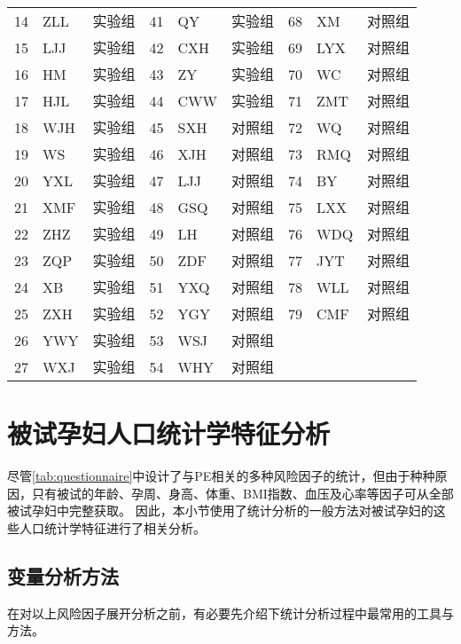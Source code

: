\begin{table}[htbp]
\begin{tabularx}{\linewidth}{X<{\centering}X<{\centering}X<{\centering}X<{\centering}X<{\centering}X<{\centering}X<{\centering}X<{\centering}X<{\centering}}
      14    & ZLL   & 实验组   & 41    & QY    & 实验组   & 68    & XM    & 对照组 \\
      15    & LJJ   & 实验组   & 42    & CXH   & 实验组   & 69    & LYX   & 对照组 \\
      16    & HM    & 实验组   & 43    & ZY    & 实验组   & 70    & WC    & 对照组 \\
      17    & HJL   & 实验组   & 44    & CWW   & 实验组   & 71    & ZMT   & 对照组 \\
      18    & WJH   & 实验组   & 45    & SXH   & 对照组   & 72    & WQ    & 对照组 \\
      19    & WS    & 实验组   & 46    & XJH   & 对照组   & 73    & RMQ   & 对照组 \\
      20    & YXL   & 实验组   & 47    & LJJ   & 对照组   & 74    & BY    & 对照组 \\
      21    & XMF   & 实验组   & 48    & GSQ   & 对照组   & 75    & LXX   & 对照组 \\
      22    & ZHZ   & 实验组   & 49    & LH    & 对照组   & 76    & WDQ   & 对照组 \\
      23    & ZQP   & 实验组   & 50    & ZDF   & 对照组   & 77    & JYT   & 对照组 \\
      24    & XB    & 实验组   & 51    & YXQ   & 对照组   & 78    & WLL   & 对照组 \\
      25    & ZXH   & 实验组   & 52    & YGY   & 对照组   & 79    & CMF   & 对照组 \\
      26    & YWY   & 实验组   & 53    & WSJ   & 对照组   &       &       &  \\
      27    & WXJ   & 实验组   & 54    & WHY   & 对照组   &       &       &  \\
      \bottomrule
      \end{tabularx}%
\end{table}%

\section{被试孕妇人口统计学特征分析}
尽管\autoref{tab:questionnaire}中设计了与PE相关的多种风险因子的统计，但由于种种原因，只有被试的年龄、孕周、身高、体重、BMI指数、血压及心率等因子可从全部被试孕妇中完整获取。
因此，本小节使用了统计分析的一般方法对被试孕妇的这些人口统计学特征进行了相关分析。
\subsection{变量分析方法}
在对以上风险因子展开分析之前，有必要先介绍下统计分析过程中最常用的工具与方法。

